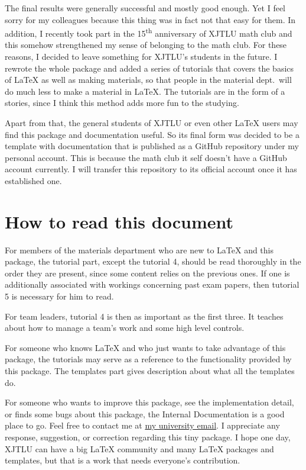 The final results were generally successful and mostly good enough. Yet I feel sorry for my colleagues because this thing was in fact not that easy for them. In addition, I recently took part in the 15\textsuperscript{th} anniversary of XJTLU math club and this somehow strengthened my sense of belonging to the math club. For these reasons, I decided to leave something for XJTLU's students in the future. I rewrote the whole package and added a series of tutorials that covers the basics of \LaTeX{} as well as making materials, so that people in the material dept.~will do much less to make a material in \LaTeX. The tutorials are in the form of a stories, since I think this method adds more fun to the studying.

Apart from that, the general students of XJTLU or even other \LaTeX{} users may find this package and documentation useful. So its final form was decided to be a template with documentation that is published as a GitHub repository under my personal account. This is because the math club it self doesn't have a GitHub account currently. I will transfer this repository to its official account once it has established one.

\section{How to read this document}
For members of the materials department who are new to \LaTeX{} and this package, the tutorial part, except the tutorial 4, should be read thoroughly in the order they are present, since some content relies on the previous ones. If one is additionally associated with workings concerning past exam papers, then tutorial 5 is necessary for him to read.

For team leaders, tutorial 4 is then as important as the first three. It teaches about how to manage a team's work and some high level controls.

For someone who knows \LaTeX{} and who just wants to take advantage of this package, the tutorials may serve as a reference to the functionality provided by this package. The templates part gives description about what all the templates do.

For someone who wants to improve this package, see the implementation detail, or finds some bugs about this package, the Internal Documentation is a good place to go. Feel free to contact me at \href{mailto:guanyuming.he20@student.xjtlu.edu.cn}{my university email}. I appreciate any response, suggestion, or correction regarding this tiny package. I hope one day, XJTLU can have a big \LaTeX{} community and many \LaTeX{} packages and templates, but that is a work that needs everyone's contribution.